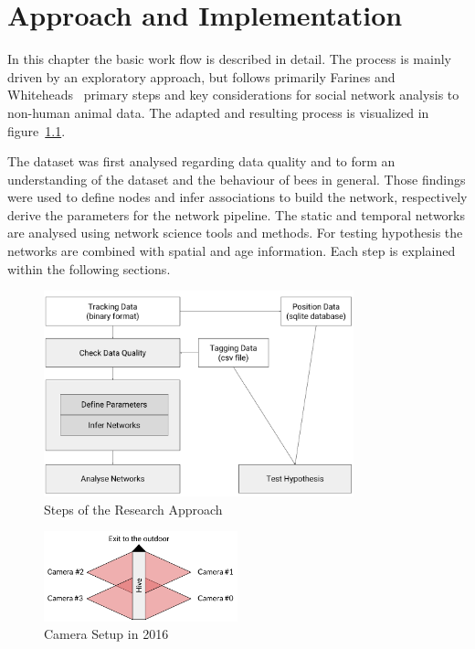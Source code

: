 \chapter{Approach and Implementation}
\label{ch:approach}
In this chapter the basic work flow is described in detail. The process is mainly driven by an exploratory approach, but follows primarily Farines and Whiteheads~\cite{farine2015constructing} primary steps and key considerations for social network analysis to non-human animal data. The adapted and resulting process is visualized in figure~\ref{fig:process}.

The dataset was first analysed regarding data quality and to form an understanding of the dataset and the behaviour of bees in general. Those findings were used to define nodes and infer associations to build the network, respectively derive the parameters for the network pipeline. The static and temporal networks are analysed using network science tools and methods. For testing hypothesis the networks are combined with spatial and age information. Each step is explained within the following sections.

\begin{figure}[htb]
	\centering
	\includegraphics[width=0.8\textwidth]{Figures/process}
	\caption{Steps of the Research Approach}
	\label{fig:process}
\end{figure}

\begin{figure}[htb]
	\centering
	\includegraphics[width=0.5\textwidth]{Figures/setupCams}
	\caption[Camera Setup in 2016]{Camera Setup in 2016}
	\label{fig:cams}
\end{figure}


